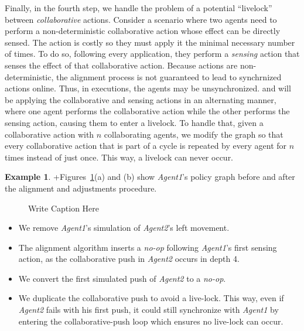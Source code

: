 \documentclass[letterpaper]{article} %
\theoremstyle{definition}
\newtheorem{example}{Example}
\begin{document}
Finally, in the fourth step, we handle the problem of a potential ``livelock''
between \emph{collaborative} actions. Consider a scenario where two agents need to perform a non-deterministic collaborative action whose effect can be directly sensed. The action is costly so they must apply it the minimal necessary number of times. To do so, following every application, they perform a \emph{sensing} action that senses the effect of that collaborative action.
Because actions are non-deterministic, the alignment process is
not guaranteed to lead to synchrnized actions online.
Thus, in 
executions, the agents may be unsynchronized. 
and will be applying the collaborative and sensing actions in an alternating manner, where one agent performs the collaborative action while the other performs the sensing action, causing them to enter a livelock. To handle that, given a collaborative action with $n$ collaborating agents, we modify the graph so that every collaborative action that is part of a cycle is repeated by every agent for $n$ times instead of just once. This way, a livelock can never occur.

\begin{example}
+Figures~\ref{Fig:Alignment}(a) and (b) show \emph{Agent1}'s policy graph before and after the alignment and adjustments procedure.

\begin{figure}
    \centering
      \hfill
\caption{Write Caption Here}
\label{Fig:Alignment}
\end{figure}

\begin{itemize}
    \item We remove \emph{Agent1}'s simulation of \emph{Agent2}'s left movement.
    \item The alignment algorithm inserts a {\em no-op} following \emph{Agent1}'s first sensing action, as the collaborative push in \emph{Agent2} occurs in depth 4.
    \item We convert the first simulated push of \emph{Agent2} to a {\em no-op}.
    \item We duplicate the collaborative push to avoid a live-lock. This way, even if \emph{Agent2} fails with his first push, it could still synchronize with \emph{Agent1} by entering the collaborative-push loop which ensures no live-lock can occur.
\end{itemize}
\end{example}
\end{document}
